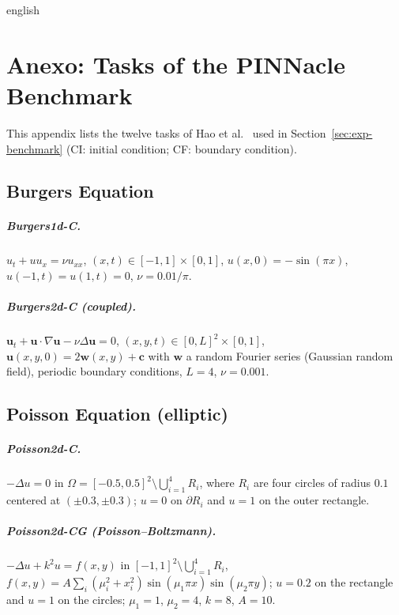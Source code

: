
\begin{hyphenrules}{english}

\chapter{Anexo: Tasks of the PINNacle Benchmark}\label{app:benchmark}

This appendix lists the twelve tasks of Hao et al.~\cite{hao2024pinnacle} used in Section~\ref{sec:exp-benchmark}
(CI: initial condition; CF: boundary condition).

\section{Burgers Equation}
\paragraph{Burgers1d-C.} $u_t+uu_x=\nu u_{xx}$, $(x,t)\in[-1,1]\times[0,1]$, $u(x,0)=-\sin(\pi x)$,
$u(-1,t)=u(1,t)=0$, $\nu=0.01/\pi$.

\paragraph{Burgers2d-C (coupled).} $\mathbf{u}_t+\mathbf{u}\cdot\nabla\mathbf{u}-\nu\Delta\mathbf{u}=0$,
$(x,y,t)\in[0,L]^2\times[0,1]$, $\mathbf{u}(x,y,0)=2\mathbf{w}(x,y)+\mathbf{c}$ with $\mathbf{w}$ a random
Fourier series (Gaussian random field), periodic boundary conditions, $L=4$, $\nu=0.001$.

\section{Poisson Equation (elliptic)}
\paragraph{Poisson2d-C.} $-\Delta u=0$ in $\Omega=[-0.5,0.5]^2\setminus\bigcup_{i=1}^{4}R_i$, where $R_i$
are four circles of radius $0.1$ centered at $(\pm0.3,\pm0.3)$; $u=0$ on $\partial R_i$ and $u=1$ on the
outer rectangle.

\paragraph{Poisson2d-CG (Poisson--Boltzmann).} $-\Delta u+k^2u=f(x,y)$ in
$[-1,1]^2\setminus\bigcup_{i=1}^{4}R_i$, $f(x,y)=A\sum_i(\mu_i^2+x_i^2)\sin(\mu_1\pi x)\sin(\mu_2\pi y)$;
$u=0.2$ on the rectangle and $u=1$ on the circles; $\mu_1=1$, $\mu_2=4$, $k=8$, $A=10$.


\end{hyphenrules}
